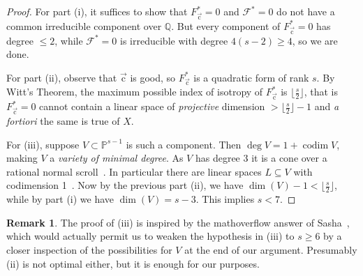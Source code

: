 \documentclass[letterpaper,11pt]{amsart}
\numberwithin{equation}{section}
\theoremstyle{definition}
\newtheorem{remark}[theorem]{Remark}
\numberwithin{equation}{section}
\newcommand{\QQ}{\mathbb{Q}}
\newcommand{\uc}{{\vec{\mathrm{c}}}}
\def\scrF{{\mathcal F}}
\begin{document}
  \begin{proof}
  	For part (i), it suffices to show that  \(F^*_\uc=0\) and \(\scrF^*=0\) do not have a common irreducible component over \({\QQ}\). But every component of  \(F^*_\uc=0\) has degree \(\leq 2\), while \(\scrF^*=0\) is irreducible with degree \(4(s-2)\geq4\), so we are done.
  	
  	For part (ii), observe that \(\uc\) is good, so \(F^*_\uc\) is a quadratic form of rank \(s\). By Witt's Theorem, the maximum possible index of isotropy of  \(F^*_\uc\) is \(\lfloor\frac{s}{2}\rfloor \), that is
   \(F^*_\uc=0\) cannot contain a  linear space of \emph{projective} dimension  \(>\lfloor\frac{s}{2}\rfloor -1\) and \textit{a fortiori} the same is true of \(X\).

    For (iii), suppose \(V\subset \mathbb P^{s-1}\) is such a component.
    Then \(\deg V = 1+\operatorname{codim} V\), making \(V\) a \emph{variety of minimal degree}. As \(V\) has degree 3 it is a cone over a rational normal scroll~\cite[Theorem~1]{EH}. In particular there are linear spaces \(L\subseteq V\) with codimension 1~\cite[p5]{EH}. Now by the previous part (ii), we have \(\dim(V)-1 <\lfloor\frac{s}{2}\rfloor\), while by part (i) we have \(\dim(V) = s-3\). This implies \(s <7\).
  \end{proof}

  \begin{remark}
  The proof of (iii) is inspired by the mathoverflow answer of Sasha~\cite{sasha}, which would actually permit us to weaken the hypothesis in (iii) to \(s\geq 6\) by a closer inspection of the possibilities for \(V\) at the end of our argument. Presumably (ii) is not optimal either, but it is enough for our purposes.
  \end{remark}
\end{document}
